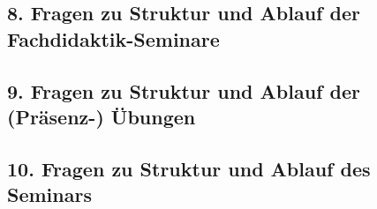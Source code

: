 \documentclass[a4paper,10pt]{article}
\makeatletter
\def\saveenum{\xdef\@savedenum{\the\c@enumi\relax}}
\makeatother
\begin{document}
{\begin{enumerate}
\end{enumerate} \saveenum

\vspace{-1cm}


\pagebreak


\subsection*{8. Fragen zu Struktur und Ablauf der Fachdidaktik-Seminare}



\pagebreak


\subsection*{9. Fragen zu Struktur und Ablauf der (Präsenz-) Übungen}



\pagebreak


\subsection*{10. Fragen zu Struktur und Ablauf des Seminars}


 \\

\begin{enumerate}


\end{enumerate}}
\end{document}
